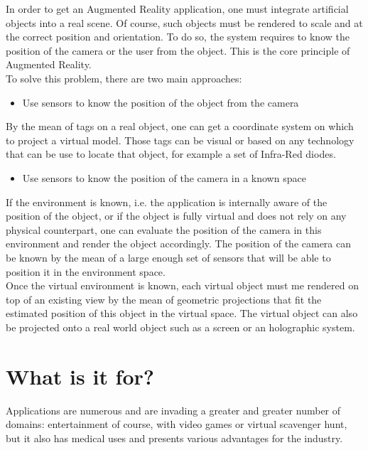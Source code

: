 In order to get an Augmented Reality application, one must integrate artificial objects into a real scene. Of course, such objects must be rendered to scale and at the correct position and orientation. To do so, the system requires to know the position of the camera or the user from the object. This is the core principle of Augmented Reality.\\

To solve this problem, there are two main approaches:

\begin{itemize}
\item{Use sensors to know the position of the object from the camera}
\end{itemize}

By the mean of tags on a real object, one can get a coordinate system on which to project a virtual model. Those tags can be visual or based on any technology that can be use to locate that object, for example a set of Infra-Red diodes.

\begin{itemize}
\item{Use sensors to know the position of the camera in a known space}
\end{itemize}

If the environment is known, i.e. the application is internally aware of the position of the object, or if the object is fully virtual and does not rely on any physical counterpart, one can evaluate the position of the camera in this environment and render the object accordingly. The position of the camera can be known by the mean of a large enough set of sensors that will be able to position it in the environment space.\\

Once the virtual environment is known, each virtual object must me rendered on top of an existing view by the mean of geometric projections that fit the estimated position of this object in the virtual space. The virtual object can also be projected onto a real world object such as a screen or an holographic system.

\section{What is it for?}
\label{sec:what_is_ar_for}

Applications are numerous and are invading a greater and greater number of domains: entertainment of course, with video games or virtual scavenger hunt, but it also has medical uses and presents various advantages for the industry.\\

